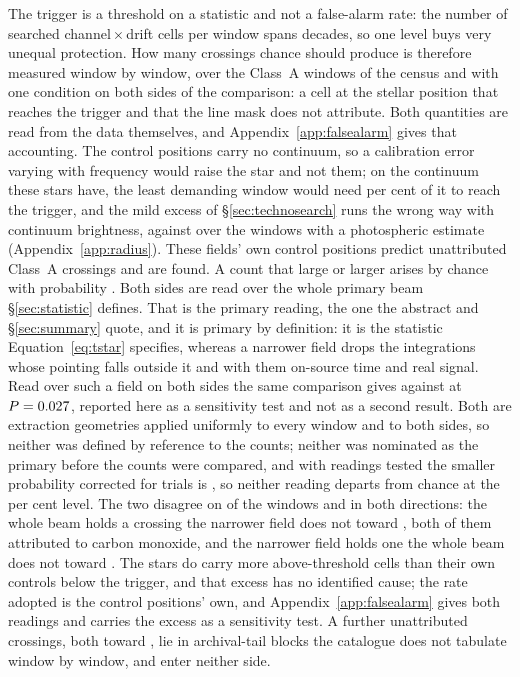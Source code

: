 The trigger is a threshold on a statistic and not a false-alarm rate: the
number of searched channel\,$\times$\,drift cells per window spans
\TuCellsDecades{} decades, so one level buys very unequal protection. How
many crossings chance should produce is therefore measured window by window,
over the \CeNWin{} Class~A windows of the census and with one condition on
both sides of the comparison: a cell at the stellar position that reaches the
trigger and that the line mask does not attribute. Both quantities are read from the data themselves, and
Appendix~\ref{app:falsealarm} gives that accounting. The control positions carry no continuum, so a calibration error varying
with frequency would raise the star and not them; on the continuum these
stars have, the least demanding window would need
\CyEpsMinPct{} per cent of it to reach the trigger, and the mild excess of
\S\ref{sec:technosearch} runs the wrong way with continuum brightness,
\CkRatioContBright{} against \CkRatioContFaint{} over the \CkNContWin{}
windows with a photospheric estimate (Appendix~\ref{app:radius}). These fields' own control positions predict \CeExp{} unattributed
Class~A crossings and \CeObs{} are found. A count that large or larger arises
by chance with probability \CeProbNull. Both sides are read over the whole
primary beam \S\ref{sec:statistic} defines. That is the primary reading, the
one the abstract and \S\ref{sec:summary} quote, and it is primary by
definition: it is the statistic Equation~\ref{eq:tstar} specifies, whereas a
narrower field drops the integrations whose pointing falls outside it and
with them on-source time and real signal. Read over such a field on both
sides the same comparison gives \FrNarrowObs{} against \FrNarrowExp{} at
$P=0.027$, reported here as a sensitivity test and not as a second
result. Both are extraction geometries applied uniformly to every window and
to both sides, so neither was defined by reference to the counts; neither was
nominated as the primary before the counts were compared, and with
\FrNRead{} readings tested the smaller probability corrected for \FrNRead{}
trials is \FrTwoTrialP, so neither reading departs from chance at the
\CeAlphaPct{} per cent level. The two disagree on \FrNFlag{} of the
\CeNWin{} windows and in both directions: the whole beam holds a crossing the
narrower field does not toward \FrUpStars, both of them attributed to carbon
monoxide, and the narrower field holds one the whole beam does not toward
\FrDownStars. The stars do carry more above-threshold cells than their own
controls below the trigger, and that excess has no identified cause; the rate
adopted is the control positions' own, and
Appendix~\ref{app:falsealarm} gives both readings and carries the excess
as a sensitivity test. A further \CeNTailCrossWord{} unattributed
crossings, both toward \CeTailStar, lie in archival-tail blocks the catalogue
does not tabulate window by window, and enter neither side.

